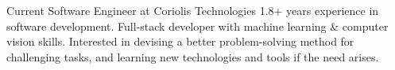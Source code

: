 

\begin{cvparagraph}

Current Software Engineer at Coriolis Technologies 1.8+ years experience in software development. Full-stack developer with machine learning \& computer vision skills. Interested in devising a better problem-solving method for challenging tasks, and learning new technologies and tools if the need arises.
\end{cvparagraph}
